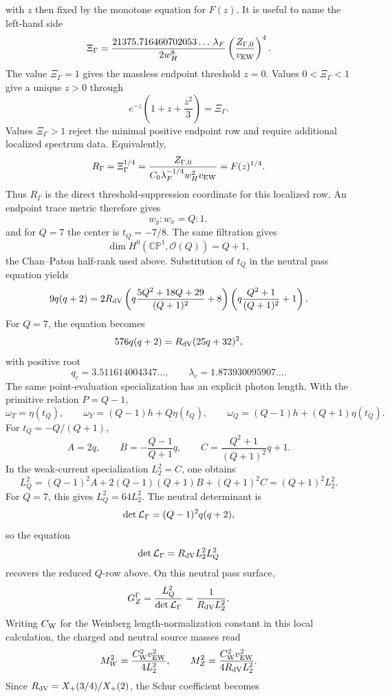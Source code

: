 \documentclass[11pt]{article}
\theoremstyle{definition}
\theoremstyle{remark}
\newcommand{\CP}{\mathbb{CP}}
\newcommand{\cO}{\mathcal O}
\newcommand{\Xp}{X_+}
\begin{document}
with \(z\) then fixed by the monotone equation for \(F(z)\).
It is useful to name the left-hand side
\[
  \Xi_\Gamma
  =
  \frac{21375.716460702053\ldots\,\lambda_F}{2w_H^8}
  \left(\frac{Z_{\Gamma,0}}{v_{\rm EW}}\right)^4 .
\]
The value \(\Xi_\Gamma=1\) gives the massless endpoint threshold \(z=0\).
Values \(0<\Xi_\Gamma<1\) give a unique \(z>0\) through
\[
  e^{-z}\left(1+z+\frac{z^2}{3}\right)=\Xi_\Gamma .
\]
Values \(\Xi_\Gamma>1\) reject the minimal positive endpoint row and require
additional localized spectrum data.
Equivalently,
\[
  R_\Gamma
  =
  \Xi_\Gamma^{1/4}
  =
  \frac{Z_{\Gamma,0}}
       {C_0\lambda_F^{-1/4}w_H^2v_{\rm EW}}
  =
  F(z)^{1/4}.
\]
Thus \(R_\Gamma\) is the direct threshold-suppression coordinate for this
localized row.
An endpoint trace metric therefore gives
\[
  w_y:w_x=Q:1,
\]
and for \(Q=7\) the center is \(t_Q=-7/8\).  The same filtration gives
\[
  \dim H^0(\CP^1,\cO(Q))=Q+1,
\]
the Chan--Paton half-rank used above.
Substitution of \(t_Q\) in the neutral pass equation yields
\[
  9q(q+2)
  =
  2R_{\rm dV}
  \left(
  q\frac{5Q^2+18Q+29}{(Q+1)^2}+8
  \right)
  \left(
  q\frac{Q^2+1}{(Q+1)^2}+1
  \right).
\]
For \(Q=7\), the equation becomes
\[
  576q(q+2)=R_{\rm dV}(25q+32)^2,
\]
with positive root
\[
  q_c=3.511614004347\ldots,\qquad
  \lambda_c=1.873930095907\ldots .
\]
The same point-evaluation specialization has an explicit photon length.
With the primitive relation \(P=Q-1\),
\[
  \omega_T=\eta(t_Q),
  \qquad
  \omega_Y=(Q-1)h+Q\eta(t_Q),
  \qquad
  \omega_Q=(Q-1)h+(Q+1)\eta(t_Q).
\]
For \(t_Q=-Q/(Q+1)\),
\[
  A=2q,\qquad
  B=-\frac{Q-1}{Q+1}q,\qquad
  C=\frac{Q^2+1}{(Q+1)^2}q+1.
\]
In the weak-current specialization \(L_2^2=C\), one obtains
\[
  L_Q^2
  =
  (Q-1)^2A+2(Q-1)(Q+1)B+(Q+1)^2C
  =
  (Q+1)^2L_2^2.
\]
For \(Q=7\), this gives \(L_Q^2=64L_2^2\).  The neutral determinant is
\[
  \det{\cal L}_\Gamma=(Q-1)^2q(q+2),
\]
so the equation
\[
  \det{\cal L}_\Gamma=R_{\rm dV}L_2^2L_Q^2
\]
recovers the reduced \(Q\)-row above.
On this neutral pass surface,
\[
  G_Z^\Gamma
  =
  \frac{L_Q^2}{\det{\cal L}_\Gamma}
  =
  \frac{1}{R_{\rm dV}L_2^2}.
\]
Writing \(C_{\rm W}\) for the Weinberg length-normalization constant in this
local calculation, the charged and neutral source masses read
\[
  M_W^2=\frac{C_{\rm W}^2v_{\rm EW}^2}{4L_2^2},
  \qquad
  M_Z^2=\frac{C_{\rm W}^2v_{\rm EW}^2}{4R_{\rm dV}L_2^2}.
\]
Since \(R_{\rm dV}=\Xp(3/4)/\Xp(2)\), the Schur coefficient becomes
\end{document}

